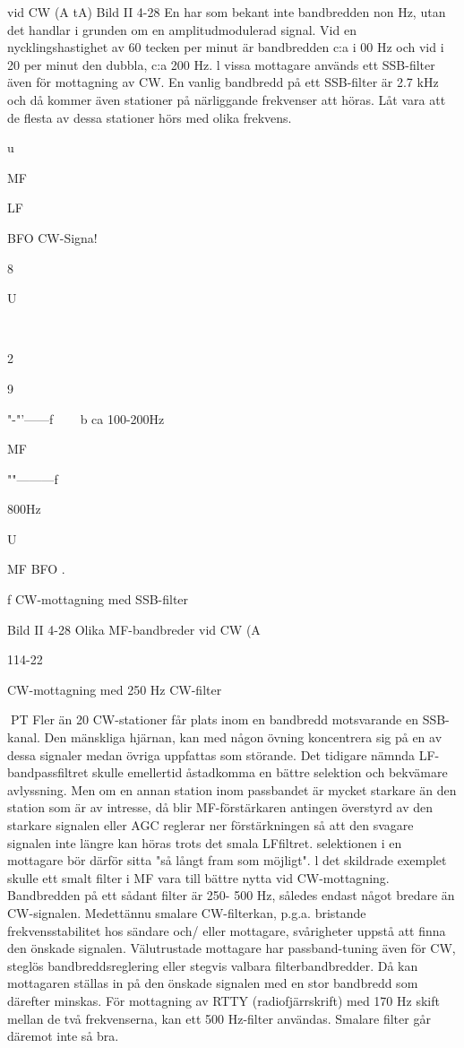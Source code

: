 \documentclass[a4paper,twoside,twocolumn,openright]{book}
\begin{document}
{{{vid CW (A tA)
Bild II 4-28
En
har som bekant inte bandbredden non Hz, utan det handlar i grunden
om en amplitudmodulerad signal. Vid en
nycklingshastighet av 60 tecken per minut
är bandbredden c:a i 00 Hz och vid i 20
per minut den dubbla, c:a 200 Hz.
l vissa mottagare används ett SSB-filter
även för mottagning av CW. En vanlig bandbredd på ett SSB-filter är 2.7 kHz och då
kommer även stationer på närliggande frekvenser att höras. Låt vara att de flesta av
dessa stationer hörs med olika frekvens.

u

MF

LF

BFO
CW-Signa!

8

U

~~~

2

9

"-"'------f
~~~ b ca 100-200Hz

MF

""---------f

800Hz

U

MF
BFO .

f
CW-mottagning med SSB-filter

Bild II 4-28 Olika MF-bandbreder vid CW (A

114-22

CW-mottagning med 250 Hz CW-filter

PT
Fler än 20 CW-stationer får plats inom en
bandbredd motsvarande en SSB-kanal. Den
mänskliga hjärnan, kan med någon övning
koncentrera sig på en av dessa signaler
medan övriga uppfattas som störande.
Det tidigare nämnda LF-bandpassfiltret
skulle emellertid åstadkomma en bättre selektion och bekvämare avlyssning. Men om
en annan station inom passbandet är mycket
starkare än den station som är av intresse,
då blir MF-förstärkaren antingen överstyrd
av den starkare signalen eller AGC reglerar
ner förstärkningen så att den svagare signalen inte längre kan höras trots det smala LFfiltret. selektionen i en mottagare bör därför
sitta "så långt fram som möjligt". l det skildrade exemplet skulle ett smalt filter i MF vara
till bättre nytta vid CW-mottagning. Bandbredden på ett sådant filter är 250- 500 Hz,
således endast något bredare än CW-signalen.
Medettännu smalare CW-filterkan, p.g.a.
bristande frekvensstabilitet hos sändare och/
eller mottagare, svårigheter uppstå att finna
den önskade signalen. Välutrustade mottagare har passband-tuning även för CW,
steglös bandbreddsreglering eller stegvis
valbara filterbandbredder. Då kan mottagaren ställas in på den önskade signalen med
en stor bandbredd som därefter minskas.
För mottagning av RTTY (radiofjärrskrift)
med 170 Hz skift mellan de två frekvenserna, kan ett 500 Hz-filter användas. Smalare filter går däremot inte så bra.

}}}
\end{document}
